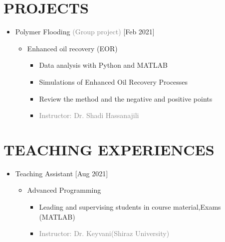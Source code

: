 \documentclass[10pt,a4paper,sans]{moderncv} %
\begin{document}
	
	
	\vspace{  -0.9 em}
	\vspace{-2em}
	\section{PROJECTS}
	\begin{itemize}
		\item  Polymer Flooding    \hfill\textcolor{gray}{(Group project)}   [Feb 2021]
		\begin{itemize}
			\item Enhanced oil recovery (EOR) 
			\begin{itemize} 
		     	\item Data analysis with Python and MATLAB
		     	\item Simulations of Enhanced Oil Recovery Processes
				\item Review the method and the negative and positive points
				
			    
				\item\textcolor{gray}{Instructor: Dr. Shadi Hassanajili}
			\end{itemize}
			
				\newline
			
		\end{itemize}
	\end{itemize}
	\vspace{-0.5em}
	\section{TEACHING EXPERIENCES}
	\begin{itemize}
		\item Teaching Assistant       \hfill[Aug 2021]
		\begin{itemize}

			\item {} Advanced Programming 
			\begin{itemize} 
				\item Leading and supervising students in course material,Exams (MATLAB)
				\item\textcolor{gray}{Instructor: Dr. Keyvani(Shiraz University)}
			\end{itemize}
	 		
				\newline
			
		\end{itemize}
	\end{itemize}
	
\end{document}
